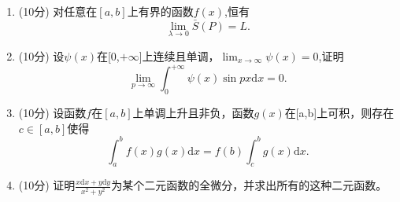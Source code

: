 \begin{enumerate}
    \item (10分) 对任意在\([a,b]\)上有界的函数\(f(x)\),恒有
    \begin{equation*}
        \lim_{\lambda\to 0} \bar{S}(P)=L.
    \end{equation*}

    \item (10分) 设\(\psi(x)\)在[0,\(+\infty\)]上连续且单调，\(\lim_{x \to \infty}\psi(x)=0\),证明
    \begin{equation*}
        \lim_{p \to \infty}\int_0^{+\infty}\psi(x)\sin px \mathrm{d} x=0.
    \end{equation*}

    \item (10分) 设函数\(f\)在\([a,b]\)上单调上升且非负，函数\(g(x)\)在[a,b]上可积，则存在\(c \in [a,b]\)使得
    \begin{equation*}
        \int_a^b f(x)g(x) \mathrm{d}x=f(b)\int_c^b g(x) \mathrm{d}x.
    \end{equation*}

    \item (10分) 证明\(\frac{x \mathrm{d}x+y\mathrm{d}y}{x^2+y^2}\)为某个二元函数的全微分，并求出所有的这种二元函数。
\end{enumerate}